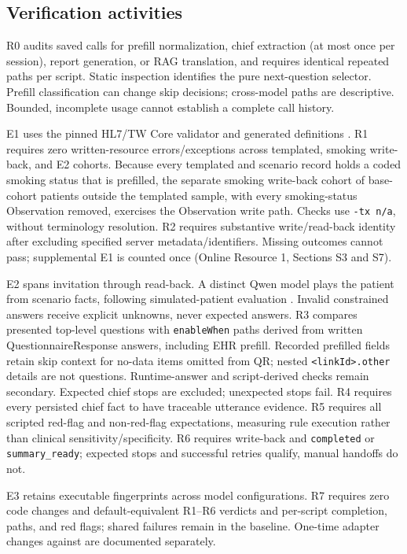 \subsection{Verification activities}
R0 audits saved calls for prefill normalization, chief extraction (at most once per
session), report generation, or RAG translation, and requires identical repeated
paths per script. Static inspection identifies the pure next-question selector.
Prefill classification can change skip decisions; cross-model paths are descriptive.
Bounded, incomplete usage cannot establish a complete call history.

E1 uses the pinned HL7/TW Core validator and generated definitions
\citep{hl7Validator,twcoreIG}. R1 requires zero written-resource errors/exceptions
across templated, smoking write-back, and E2 cohorts. Because every templated and
scenario record holds a coded smoking status that is prefilled, the separate smoking
write-back cohort of \EOneObservationSessions{} base-cohort patients outside the
templated sample, with every smoking-status Observation removed, exercises the
Observation write path. Checks use \texttt{-tx n/a}, without terminology
resolution. R2 requires substantive write/read-back identity after excluding
specified server metadata/identifiers. Missing outcomes cannot pass; supplemental
E1 is counted once (Online Resource 1, Sections S3 and S7).

E2 spans invitation through read-back. A distinct Qwen model plays the patient
from scenario facts, following simulated-patient evaluation
\citep{tuConversationalDiagnosticArtificial2025,johriCraftMd2025,schmidgallAgentClinic2024}.
Invalid constrained answers receive explicit unknowns, never expected answers.
R3 compares presented top-level questions with \texttt{enableWhen} paths derived
from written QuestionnaireResponse answers, including EHR prefill. Recorded
prefilled fields retain skip context for no-data items omitted from QR; nested
\texttt{<linkId>.other} details are not questions. Runtime-answer and script-derived
checks remain secondary. Expected chief stops are excluded; unexpected stops fail.
R4 requires every persisted chief fact to have traceable utterance evidence.
R5 requires all scripted red-flag and non-red-flag expectations, measuring rule
execution rather than clinical sensitivity/specificity. R6 requires write-back
and \texttt{completed} or \texttt{summary\_ready}; expected stops and successful
retries qualify, manual handoffs do not.

E3 retains executable fingerprints across model configurations. R7 requires zero
code changes and default-equivalent R1--R6 verdicts and per-script completion,
paths, and red flags; shared failures remain in the baseline. One-time adapter
changes against \texttt{\AdapterBaseCommit} are documented separately.

